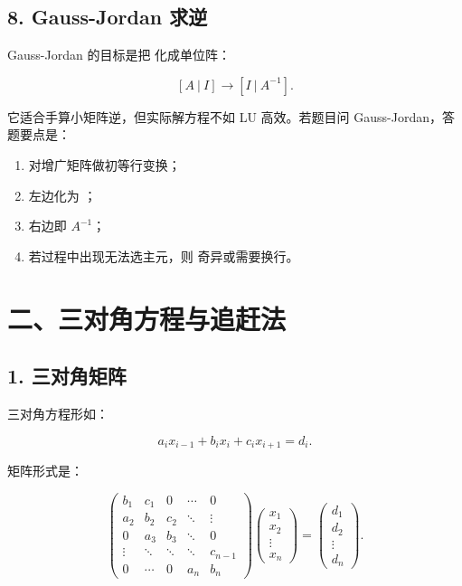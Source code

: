 \documentclass[11pt,a4paper]{ctexart}
\newcommand{\code}[1]{\begingroup\ttfamily\small #1\endgroup}
\begin{document}

\subsection*{8. Gauss-Jordan 求逆}


Gauss-Jordan 的目标是把 \code{} 化成单位阵：

\[
[A\ |\ I]\longrightarrow [I\ |\ A^{-1}].
\]

它适合手算小矩阵逆，但实际解方程不如 LU 高效。若题目问 Gauss-Jordan，答题要点是：

\begin{enumerate}

\item 对增广矩阵做初等行变换；

\item 左边化为 \code{}；

\item 右边即 $A^{-1}$；

\item 若过程中出现无法选主元，则 \code{} 奇异或需要换行。

\end{enumerate}


\section*{二、三对角方程与追赶法}



\subsection*{1. 三对角矩阵}


三对角方程形如：

\[
a_i x_{i-1}+b_i x_i+c_i x_{i+1}=d_i.
\]

矩阵形式是：

\[
\begin{pmatrix}
b_1&c_1&0&\cdots&0\\
a_2&b_2&c_2&\ddots&\vdots\\
0&a_3&b_3&\ddots&0\\
\vdots&\ddots&\ddots&\ddots&c_{n-1}\\
0&\cdots&0&a_n&b_n
\end{pmatrix}
\begin{pmatrix}x_1\\x_2\\\vdots\\x_n\end{pmatrix}
=
\begin{pmatrix}d_1\\d_2\\\vdots\\d_n\end{pmatrix}.
\]
\end{document}

